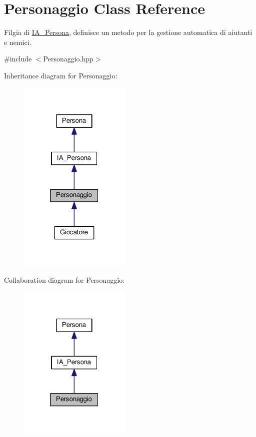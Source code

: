 \hypertarget{classPersonaggio}{}\section{Personaggio Class Reference}
\label{classPersonaggio}


Filgia di \hyperlink{classIA__Persona}{I\+A\+\_\+\+Persona}, definisce un metodo per la gestione automatica di aiutanti e nemici.  




{\ttfamily \#include $<$Personaggio.\+hpp$>$}



Inheritance diagram for Personaggio\+:\nopagebreak
\begin{figure}[H]
\begin{center}
\leavevmode
\includegraphics[width=151pt]{classPersonaggio__inherit__graph}
\end{center}
\end{figure}


Collaboration diagram for Personaggio\+:\nopagebreak
\begin{figure}[H]
\begin{center}
\leavevmode
\includegraphics[width=151pt]{classPersonaggio__coll__graph}
\end{center}
\end{figure}
